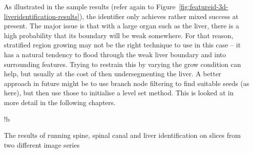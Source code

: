 As illustrated in the sample results (refer again to Figure~\ref{fig:featureid-3d-liveridentification-results}), the identifier only achieves rather mixed success at present. The major issue is that with a large organ such as the liver, there is a high probability that its boundary will be weak somewhere. For that reason, stratified region growing may not be the right technique to use in this case -- it has a natural tendency to flood through the weak liver boundary and into surrounding features. Trying to restrain this by varying the grow condition can help, but usually at the cost of then undersegmenting the liver. A better approach in future might be to use branch node filtering to find suitable seeds (as here), but then use those to initialise a level set method. This is looked at in more detail in the following chapters.

\begin{stusubfig}{!b}
	\\
\caption{The results of running spine, spinal canal and liver identification on slices from two different image series}
\label{fig:featureid-3d-liveridentification-results}
\end{stusubfig}

